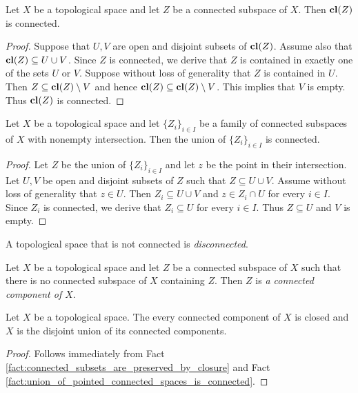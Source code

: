 \begin{fact}\label{fact:connected_subsets_are_preserved_by_closure}
	Let $X$ be a topological space and let $Z$ be a connected subspace of $X$. Then $\mathbf{cl}(Z)$ is connected.
\end{fact}
\begin{proof}
	Suppose that $U, V$ are open and disjoint subsets of $\mathbf{cl}(Z)$. Assume also that $\mathbf{cl}(Z) \subseteq U\cup V$. Since $Z$ is connected, we derive that $Z$ is contained in exactly one of the sets $U$ or $V$. Suppose without loss of generality that $Z$ is contained in $U$. Then $Z \subseteq \mathbf{cl}(Z) \setminus V$ and hence $\mathbf{cl}(Z) \subseteq \mathbf{cl}(Z)\setminus V$. This implies that $V$ is empty. Thus $\mathbf{cl}(Z)$ is connected.
\end{proof}

\begin{fact}\label{fact:union_of_pointed_connected_spaces_is_connected}
	Let $X$ be a topological space and let $\{Z_i\}_{i\in I}$ be a family of connected subspaces of $X$ with nonempty intersection. Then the union of $\{Z_i\}_{i\in I}$ is connected.
\end{fact}
\begin{proof}
	Let $Z$ be the union of $\{Z_i\}_{i\in I}$ and let $z$ be the point in their intersection. Let $U,V$ be open and disjoint subsets of $Z$ such that $Z \subseteq U\cup V$. Assume without loss of generality that $z \in U$. Then $Z_i \subseteq U\cup V$ and $z\in Z_i\cap U$ for every $i\in I$. Since $Z_i$ is connected, we derive that $Z_i\subseteq U$ for every $i \in I$. Thus $Z \subseteq U$ and $V$ is empty.
\end{proof}

\begin{definition}
	A topological space that is not connected is \textit{disconnected}.
\end{definition}

\begin{definition}
	Let $X$ be a topological space and let $Z$ be a connected subspace of $X$ such that there is no connected subspace of $X$ containing $Z$. Then $Z$ is \textit{a connected component of $X$}.
\end{definition}

\begin{corollary}\label{corollary:space_is_a_union_of_its_connected_components_which_are_closed}
	Let $X$ be a topological space. The every connected component of $X$ is closed and $X$ is the disjoint union of its connected components.
\end{corollary}
\begin{proof}
	Follows immediately from Fact \ref{fact:connected_subsets_are_preserved_by_closure} and Fact \ref{fact:union_of_pointed_connected_spaces_is_connected}.
\end{proof}


\small







